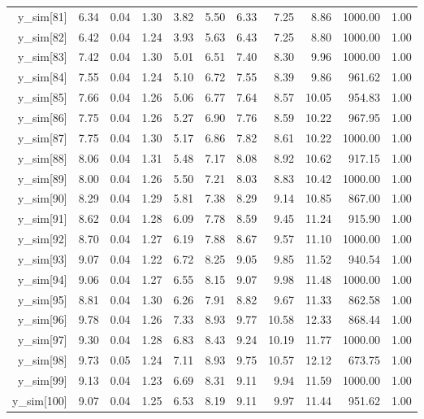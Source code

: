 \begin{table}[ht]
\begin{tabular}{rrrrrrrrrrr}
  y\_sim[81] & 6.34 & 0.04 & 1.30 & 3.82 & 5.50 & 6.33 & 7.25 & 8.86 & 1000.00 & 1.00 \\ 
  y\_sim[82] & 6.42 & 0.04 & 1.24 & 3.93 & 5.63 & 6.43 & 7.25 & 8.80 & 1000.00 & 1.00 \\ 
  y\_sim[83] & 7.42 & 0.04 & 1.30 & 5.01 & 6.51 & 7.40 & 8.30 & 9.96 & 1000.00 & 1.00 \\ 
  y\_sim[84] & 7.55 & 0.04 & 1.24 & 5.10 & 6.72 & 7.55 & 8.39 & 9.86 & 961.62 & 1.00 \\ 
  y\_sim[85] & 7.66 & 0.04 & 1.26 & 5.06 & 6.77 & 7.64 & 8.57 & 10.05 & 954.83 & 1.00 \\ 
  y\_sim[86] & 7.75 & 0.04 & 1.26 & 5.27 & 6.90 & 7.76 & 8.59 & 10.22 & 967.95 & 1.00 \\ 
  y\_sim[87] & 7.75 & 0.04 & 1.30 & 5.17 & 6.86 & 7.82 & 8.61 & 10.22 & 1000.00 & 1.00 \\ 
  y\_sim[88] & 8.06 & 0.04 & 1.31 & 5.48 & 7.17 & 8.08 & 8.92 & 10.62 & 917.15 & 1.00 \\ 
  y\_sim[89] & 8.00 & 0.04 & 1.26 & 5.50 & 7.21 & 8.03 & 8.83 & 10.42 & 1000.00 & 1.00 \\ 
  y\_sim[90] & 8.29 & 0.04 & 1.29 & 5.81 & 7.38 & 8.29 & 9.14 & 10.85 & 867.00 & 1.00 \\ 
  y\_sim[91] & 8.62 & 0.04 & 1.28 & 6.09 & 7.78 & 8.59 & 9.45 & 11.24 & 915.90 & 1.00 \\ 
  y\_sim[92] & 8.70 & 0.04 & 1.27 & 6.19 & 7.88 & 8.67 & 9.57 & 11.10 & 1000.00 & 1.00 \\ 
  y\_sim[93] & 9.07 & 0.04 & 1.22 & 6.72 & 8.25 & 9.05 & 9.85 & 11.52 & 940.54 & 1.00 \\ 
  y\_sim[94] & 9.06 & 0.04 & 1.27 & 6.55 & 8.15 & 9.07 & 9.98 & 11.48 & 1000.00 & 1.00 \\ 
  y\_sim[95] & 8.81 & 0.04 & 1.30 & 6.26 & 7.91 & 8.82 & 9.67 & 11.33 & 862.58 & 1.00 \\ 
  y\_sim[96] & 9.78 & 0.04 & 1.26 & 7.33 & 8.93 & 9.77 & 10.58 & 12.33 & 868.44 & 1.00 \\ 
  y\_sim[97] & 9.30 & 0.04 & 1.28 & 6.83 & 8.43 & 9.24 & 10.19 & 11.77 & 1000.00 & 1.00 \\ 
  y\_sim[98] & 9.73 & 0.05 & 1.24 & 7.11 & 8.93 & 9.75 & 10.57 & 12.12 & 673.75 & 1.00 \\ 
  y\_sim[99] & 9.13 & 0.04 & 1.23 & 6.69 & 8.31 & 9.11 & 9.94 & 11.59 & 1000.00 & 1.00 \\ 
  y\_sim[100] & 9.07 & 0.04 & 1.25 & 6.53 & 8.19 & 9.11 & 9.97 & 11.44 & 951.62 & 1.00 \\ 

\end{tabular}
\end{table}
